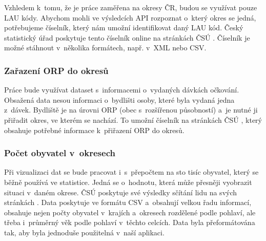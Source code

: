 Vzhledem k~tomu, že je práce zaměřena na okresy ČR, budou se využívat pouze LAU kódy. Abychom mohli ve výsledcích API rozpoznat o~který okres se jedná, potřebujeme číselník, který nám umožní identifikovat daný LAU kód. Český statistický úřad poskytuje tento číselník online na stránkách ČSÚ \cite{czso-ciselnik-lau}. Číselník je možné stáhnout v~několika formátech, např. v~XML nebo CSV.

\subsubsection*{Zařazení ORP do okresů}
\label{sec:ciselnik-orp}

Práce bude využívat dataset s~informacemi o~vydaných dávkách očkování. Obsažená data nesou informaci o~bydlišti osoby, které byla vydaná jedna z~dávek. Bydliště je na úrovni ORP (obec s~rozšířenou působností) a~je nutné ji přiřadit okres, ve kterém se nachází. To umožní číselník na stránkách ČSÚ \cite{csu-ciselnik-orp}, který obsahuje potřebné informace k~přiřazení ORP do okresů.

\subsubsection*{Počet obyvatel v~okresech}

Při vizualizaci dat se bude pracovat i~s~přepočtem na sto tisíc obyvatel, který se běžně používá ve statistice. Jedná se o~hodnotu, která může přesněji vyobrazit situaci v~daném okrese. ČSÚ poskytuje své výsledky sčítání lidu na svých stránkách \cite{czso-pocet-obyvatel}. Data poskytuje ve formátu CSV a~obsahují velkou řadu informací, obsahuje nejen počty obyvatel v~krajích a~okresech rozdělené podle pohlaví, ale třeba i~průměrný věk podle pohlaví v~těchto celcích. Data byla přeformátována tak, aby byla jednoduše použitelná v~naší aplikaci.

\endinput